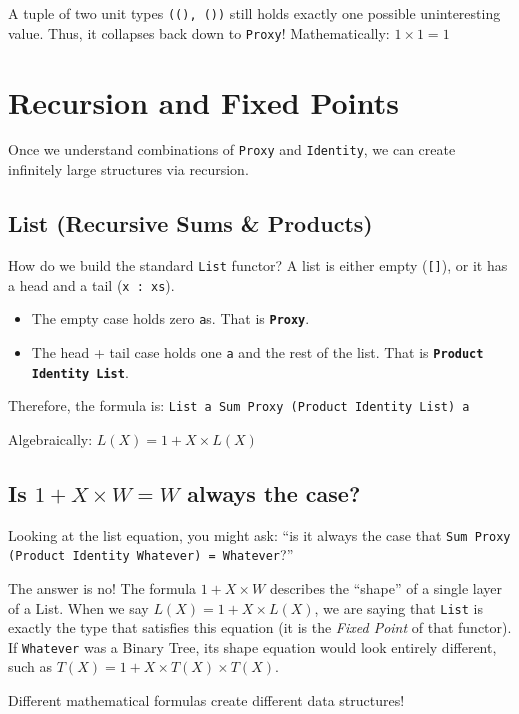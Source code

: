 \documentclass[12pt,a4paper]{article}
\begin{document}
A tuple of two unit types \texttt{((), ())} still holds exactly one possible uninteresting value. Thus, it collapses back down to \texttt{Proxy}!
Mathematically: $1 \times 1 = 1$

\section{Recursion and Fixed Points}

Once we understand combinations of \texttt{Proxy} and \texttt{Identity}, we can create infinitely large structures via recursion.

\subsection{List (Recursive Sums \& Products)}

How do we build the standard \texttt{List} functor? A list is either empty (\texttt{[]}), or it has a head and a tail (\texttt{x : xs}).
\begin{itemize}
    \item The empty case holds zero \texttt{a}s. That is \textbf{\texttt{Proxy}}.
    \item The head + tail case holds one \texttt{a} and the rest of the list. That is \textbf{\texttt{Product Identity List}}.
\end{itemize}

Therefore, the formula is:
\texttt{List a \cong Sum Proxy (Product Identity List) a}

Algebraically: $L(X) = 1 + X \times L(X)$

\subsection{Is $1 + X \times W = W$ always the case?}

Looking at the list equation, you might ask: ``is it always the case that \texttt{Sum Proxy (Product Identity Whatever) = Whatever}?''

The answer is no! The formula $1 + X \times W$ describes the ``shape'' of a single layer of a List. When we say $L(X) = 1 + X \times L(X)$, we are saying that \texttt{List} is exactly the type that satisfies this equation (it is the \textit{Fixed Point} of that functor). If \texttt{Whatever} was a Binary Tree, its shape equation would look entirely different, such as $T(X) = 1 + X \times T(X) \times T(X)$. 

Different mathematical formulas create different data structures!
\end{document}
